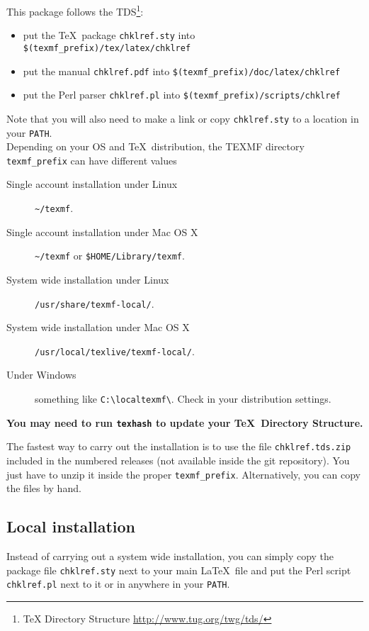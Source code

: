 \documentclass[a4paper,11pt,twoside]{article}
\begin{document}
This package follows the TDS\footnote{TeX Directory Structure
  \url{http://www.tug.org/twg/tds/}}:
\begin{itemize}
  \item  put the \TeX\ package \verb!chklref.sty! into \verb!$(texmf_prefix)/tex/latex/chklref!
  \item  put the manual \verb!chklref.pdf! into \verb!$(texmf_prefix)/doc/latex/chklref!
  \item  put the Perl parser \verb!chklref.pl! into \verb!$(texmf_prefix)/scripts/chklref!
\end{itemize}
Note that you will also need to make a link or copy \verb!chklref.sty! to a location in your \texttt{PATH}. \\

Depending on your OS and \TeX\ distribution, the TEXMF directory \verb!texmf_prefix! can have different values
\begin{description}
  \item[Single account installation under Linux] \verb!~/texmf!.
  \item[Single account installation under Mac OS X] \verb!~/texmf! or \verb!$HOME/Library/texmf!.
  \item[System wide installation under Linux] \verb!/usr/share/texmf-local/!.
  \item[System wide installation under Mac OS X] \verb!/usr/local/texlive/texmf-local/!.
  \item[Under Windows] something like \verb!C:\localtexmf\!. Check in your distribution settings.
\end{description}

\noindent \textbf{You may need to run \texttt{texhash} to update your \TeX\ Directory Structure.}

The fastest way to carry out the installation is to use the file \verb!chklref.tds.zip! included in the numbered releases (not available inside the git repository). You just have to unzip it inside the proper \verb!texmf_prefix!. Alternatively, you can copy the files by hand.

\subsection{Local installation}

Instead of carrying out a system wide installation, you can simply copy the package file \verb!chklref.sty! next to your main \LaTeX\ file and put the Perl script \verb!chklref.pl! next to it or in anywhere in your \texttt{PATH}.
\end{document}
